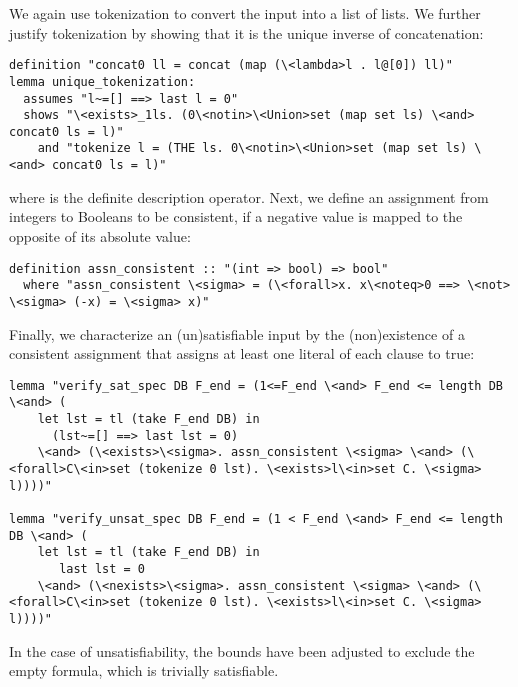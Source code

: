 \documentclass[smallcondensed]{svjour3}     %
\makeatletter
\newcommand{\isai}{\lstinline[language=isabelle,basicstyle=\normalsize\ttfamily\slshape]}
\renewcommand\lstinline[1][]{%
  \leavevmode
  \ifmmode\expandafter\hbox\fi\bgroup
    \def\lst@boxpos{b}%
    \lsthk@PreSet\lstset{flexiblecolumns,#1}%
    \lsthk@TextStyle
    \@ifnextchar\bgroup{\afterassignment\lst@InlineG \let\@let@token}%
                       \lstinline@}
\makeatother
\begin{document}
We again use tokenization to convert the input into a list of lists. 
We further justify tokenization by showing that it is the unique inverse of concatenation:
\begin{lstlisting}
definition "concat0 ll = concat (map (\<lambda>l . l@[0]) ll)"
lemma unique_tokenization: 
  assumes "l~=[] ==> last l = 0"
  shows "\<exists>_1ls. (0\<notin>\<Union>set (map set ls) \<and> concat0 ls = l)"
    and "tokenize l = (THE ls. 0\<notin>\<Union>set (map set ls) \<and> concat0 ls = l)"
\end{lstlisting}
where \isai{THE} is the definite description operator.
Next, we define an assignment from integers to Booleans to be consistent, if a negative value is mapped 
to the opposite of its absolute value:
\begin{lstlisting}
definition assn_consistent :: "(int => bool) => bool"
  where "assn_consistent \<sigma> = (\<forall>x. x\<noteq>0 ==> \<not> \<sigma> (-x) = \<sigma> x)"
\end{lstlisting}
Finally, we characterize an (un)satisfiable input by the (non)existence of a consistent assignment that assigns at least one literal of each clause to true:
\begin{lstlisting}
lemma "verify_sat_spec DB F_end = (1<=F_end \<and> F_end <= length DB \<and> (
    let lst = tl (take F_end DB) in 
      (lst~=[] ==> last lst = 0)
    \<and> (\<exists>\<sigma>. assn_consistent \<sigma> \<and> (\<forall>C\<in>set (tokenize 0 lst). \<exists>l\<in>set C. \<sigma> l))))"
    
lemma "verify_unsat_spec DB F_end = (1 < F_end \<and> F_end <= length DB \<and> (
    let lst = tl (take F_end DB) in 
       last lst = 0
    \<and> (\<nexists>\<sigma>. assn_consistent \<sigma> \<and> (\<forall>C\<in>set (tokenize 0 lst). \<exists>l\<in>set C. \<sigma> l))))"
\end{lstlisting}
In the case of unsatisfiability, the bounds have been adjusted to exclude the empty formula, which is trivially satisfiable.
\end{document}
